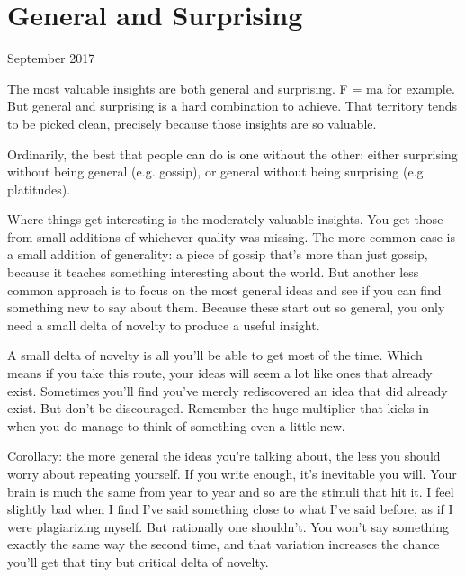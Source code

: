 \chapter{General and Surprising}


            
              
                

September 2017

The most valuable insights are both
                  general and surprising. F = ma for example. But
                  general and surprising is a hard combination to achieve. That
                  territory tends to be picked clean, precisely because those
                  insights are so valuable.

Ordinarily, the best that
                  people can do is one without the other: either surprising
                  without being general (e.g. gossip), or general without being
                  surprising (e.g. platitudes).

Where things get
                  interesting is the moderately valuable insights. You get those
                  from small additions of whichever quality was missing. The
                  more common case is a small addition of generality: a piece of
                  gossip that's more than just gossip, because it teaches
                  something interesting about the world. But another less common
                  approach is to focus on the most general ideas and see if you
                  can find something new to say about them. Because these start
                  out so general, you only need a small delta of novelty to
                  produce a useful insight.

A small delta of novelty
                  is all you'll be able to get most of the time. Which means if
                  you take this route, your ideas will seem a lot like ones that
                  already exist. Sometimes you'll find you've merely
                  rediscovered an idea that did already exist. But don't be
                  discouraged. Remember the huge multiplier that kicks in when
                  you do manage to think of something even a little new.

Corollary:
                  the more general the ideas you're talking about, the less you
                  should worry about repeating yourself. If you write enough,
                  it's inevitable you will. Your brain is much the same from
                  year to year and so are the stimuli that hit it. I feel
                  slightly bad when I find I've said something close to what
                  I've said before, as if I were plagiarizing myself. But
                  rationally one shouldn't. You won't say something exactly the
                  same way the second time, and that variation increases the
                  chance you'll get that tiny but critical delta of novelty.

